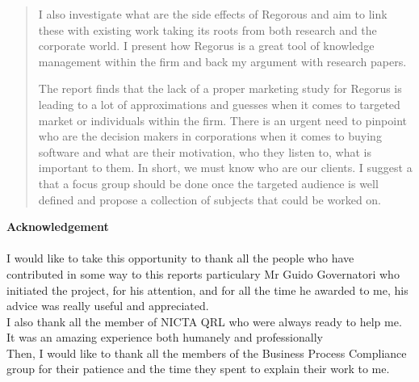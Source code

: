 \documentclass[10pt]{report}
\begin{document}
\begin{abstract}
I also investigate what are the side effects of Regorous and aim to link these with existing work taking its roots from both research and the corporate world. I present how Regorus is a great tool of knowledge management within the firm and back my argument with research papers.

The report finds that the lack of a proper marketing study for Regorus is leading to a lot of approximations and guesses when it comes to targeted market or individuals within the firm. There is an urgent need to pinpoint who are the decision makers in corporations when it comes to buying software and what are their motivation, who they listen to, what is important to them. In short, we must know who are our clients. I suggest a that a focus group should be done once the targeted audience is well defined and propose a collection of subjects that could be worked on.

\end{abstract}



\newpage

\begin{center}
\begin{minipage}{.8\textwidth}
\textbf{\large Acknowledgement}\\\\
I would like to take this opportunity to thank all the people who have contributed in some way to this reports particulary Mr Guido Governatori who initiated the project, for his attention, and for all the time he awarded to me, his advice was really useful and appreciated.\\

I also thank all the member of NICTA QRL who were always ready to help me. It was an amazing experience both humanely and professionally \\

Then, I would like to thank all the members of the Business Process Compliance group for their patience and the time they spent to explain their work to me.\\

\end{minipage}
\end{center}

\newpage

\tableofcontents
\newpage
{}
\setcounter{page}{1}
\pagestyle{fancy}
\renewcommand{\sectionmark}[1]{\markright{\thesection.\ #1}}
\fancyhead{}
\fancyhead[R]{\slshape \rightmark}
\fancyfoot{}
\fancyfoot[C]{\thepage}
\renewcommand{\headrulewidth}{0.4pt}
\renewcommand{\footrulewidth}{0 pt}
\end{document}
